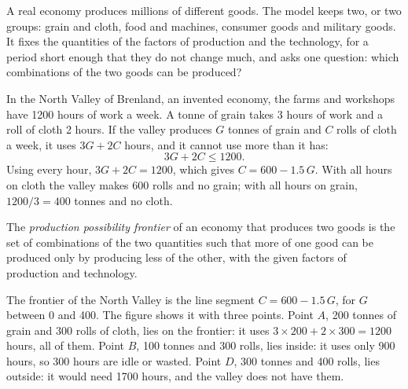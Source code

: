 A real economy produces millions of different goods. The model keeps two, or two groups: grain and
cloth, food and machines, consumer goods and military goods. It fixes the quantities of the factors
of production and the technology, for a period short enough that they do not change much, and asks
one question: which combinations of the two goods can be produced?

\begin{example}\label{ex:g10:production-possibility-frontier:north}
In the North Valley of Brenland, an invented economy, the farms and workshops have \num{1200} hours of
work a week. A tonne of grain takes 3 hours of work and a roll of cloth 2 hours. If the valley
produces $G$ tonnes of grain and $C$ rolls of cloth a week, it uses $3G + 2C$ hours, and it cannot use
more than it has:
\[
  3G + 2C \le 1200 .
\]
Using every hour, $3G + 2C = 1200$, which gives $C = 600 - 1.5\,G$. With all hours on cloth the valley
makes 600 rolls and no grain; with all hours on grain, $1200/3 = 400$ tonnes and no cloth.
\end{example}

\begin{definition}\label{def:g10:production-possibility-frontier:ppf}
The \emph{production possibility frontier} of an economy that
produces two goods is the set of combinations of the two quantities such that more of one good can be
produced only by producing less of the other, with the given factors of production and technology.
\end{definition}

The frontier of the North Valley is the line segment $C = 600 - 1.5\,G$, for $G$ between 0 and 400. The
figure shows it with three points. Point $A$, 200 tonnes of grain and 300 rolls of cloth, lies on the
frontier: it uses $3 \times 200 + 2 \times 300 = 1200$ hours, all of them. Point $B$, 100 tonnes and 300
rolls, lies inside: it uses only 900 hours, so 300 hours are idle or wasted. Point $D$, 300 tonnes and
400 rolls, lies outside: it would need \num{1700} hours, and the valley does not have them.

